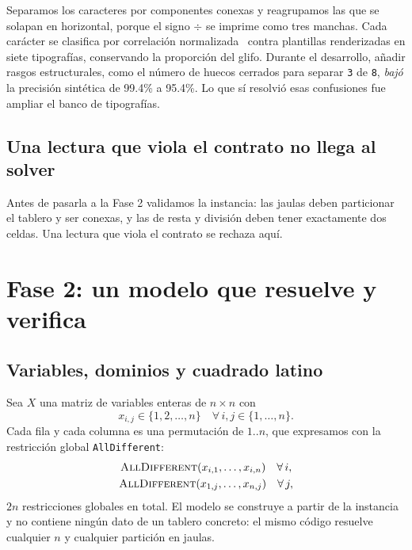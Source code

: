\documentclass[conference]{IEEEtran}
\begin{document}
Separamos los caracteres por componentes conexas y reagrupamos las que se solapan en horizontal, porque el signo $\div$ se imprime como tres manchas. Cada carácter se clasifica por correlación normalizada~\cite{lewis1995} contra plantillas renderizadas en siete tipografías, conservando la proporción del glifo. Durante el desarrollo, añadir rasgos estructurales, como el número de huecos cerrados para separar \texttt{3} de \texttt{8}, \emph{bajó} la precisión sintética de 99.4\% a 95.4\%. Lo que sí resolvió esas confusiones fue ampliar el banco de tipografías.

\subsection{Una lectura que viola el contrato no llega al solver}
Antes de pasarla a la Fase 2 validamos la instancia: las jaulas deben particionar el tablero y ser conexas, y las de resta y división deben tener exactamente dos celdas. Una lectura que viola el contrato se rechaza aquí.

\section{Fase 2: un modelo que resuelve y verifica}\label{sec:fase2}

\subsection{Variables, dominios y cuadrado latino}
Sea $X$ una matriz de variables enteras de $n \times n$ con
\[ x_{i,j} \in \{1, 2, \dots, n\} \quad \forall\, i, j \in \{1, \dots, n\}. \]
Cada fila y cada columna es una permutación de $1..n$, que expresamos con la restricción global \texttt{AllDifferent}:
\begin{gather*}
\textsc{AllDifferent}(x_{i,1}, \dots, x_{i,n}) \quad \forall\, i, \\
\textsc{AllDifferent}(x_{1,j}, \dots, x_{n,j}) \quad \forall\, j,
\end{gather*}
$2n$ restricciones globales en total. El modelo se construye a partir de la instancia y no contiene ningún dato de un tablero concreto: el mismo código resuelve cualquier $n$ y cualquier partición en jaulas.
\end{document}
